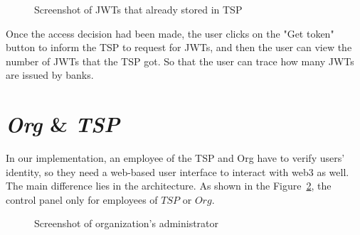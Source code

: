 \begin{figure}[htb]
    \centering
    \caption{{\footnotesize Screenshot of JWTs that already stored in TSP}}
    \label{fig:sreenshotJWT}
\end{figure}
Once the access decision had been made, the user clicks on the "Get token" button to inform the TSP to request for JWTs, and then the user can view the number of JWTs that the TSP got. So that the user can trace how many JWTs are issued by banks.

\section{\textit{Org} \& \textit{TSP}}
In our implementation, an employee of the TSP and Org have to verify users' identity, so they need a web-based user interface to interact with web3 as well. The main difference lies in the architecture. As shown in the Figure~\ref{fig:verifyID}, the control panel only for employees of \(TSP\) or \(Org\).

\begin{figure}[htb]
    \centering
    \caption{{\footnotesize Screenshot of organization's administrator}}
    \label{fig:verifyID}
\end{figure}

